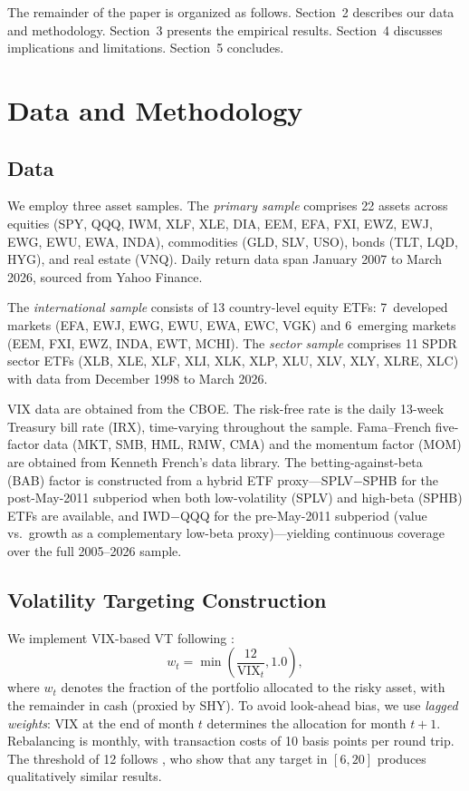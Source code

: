 \documentclass[12pt,a4paper]{article}
\begin{document}
The remainder of the paper is organized as follows. Section~2 describes our data and methodology. Section~3 presents the empirical results. Section~4 discusses implications and limitations. Section~5 concludes.


\section{Data and Methodology}

\subsection{Data}

We employ three asset samples. The \textit{primary sample} comprises 22 assets across equities (SPY, QQQ, IWM, XLF, XLE, DIA, EEM, EFA, FXI, EWZ, EWJ, EWG, EWU, EWA, INDA), commodities (GLD, SLV, USO), bonds (TLT, LQD, HYG), and real estate (VNQ). Daily return data span January 2007 to March 2026, sourced from Yahoo Finance.

The \textit{international sample} consists of 13 country-level equity ETFs: 7~developed markets (EFA, EWJ, EWG, EWU, EWA, EWC, VGK) and 6~emerging markets (EEM, FXI, EWZ, INDA, EWT, MCHI). The \textit{sector sample} comprises 11 SPDR sector ETFs (XLB, XLE, XLF, XLI, XLK, XLP, XLU, XLV, XLY, XLRE, XLC) with data from December 1998 to March 2026.

VIX data are obtained from the CBOE. The risk-free rate is the daily 13-week Treasury bill rate (IRX), time-varying throughout the sample. Fama--French five-factor data (MKT, SMB, HML, RMW, CMA) and the momentum factor (MOM) are obtained from Kenneth French's data library. The betting-against-beta (BAB) factor is constructed from a hybrid ETF proxy---SPLV$-$SPHB for the post-May-2011 subperiod when both low-volatility (SPLV) and high-beta (SPHB) ETFs are available, and IWD$-$QQQ for the pre-May-2011 subperiod (value vs.\ growth as a complementary low-beta proxy)---yielding continuous coverage over the full 2005--2026 sample.

\subsection{Volatility Targeting Construction}

We implement VIX-based VT following \citet{bozovic2024}:
\begin{equation}
w_t = \min\!\left(\frac{12}{\text{VIX}_t}, 1.0\right),
\label{eq:vt_weight}
\end{equation}
where $w_t$ denotes the fraction of the portfolio allocated to the risky asset, with the remainder in cash (proxied by SHY). To avoid look-ahead bias, we use \textit{lagged weights}: VIX at the end of month $t$ determines the allocation for month $t+1$. Rebalancing is monthly, with transaction costs of 10 basis points per round trip. The threshold of 12 follows \citet{lai2026a}, who show that any target in $[6, 20]$ produces qualitatively similar results.
\end{document}
